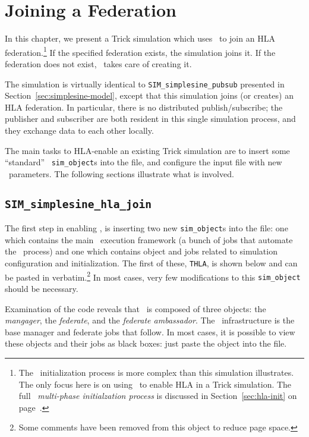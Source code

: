 \chapter{Joining a Federation}
\label{sec:hla-join}

In this chapter, we present a Trick simulation which uses
\TrickHLA\ to join an HLA federation.\footnote{
  The \TrickHLA\ initialization process is more complex than this
  simulation illustrates.
  The only focus here is on using \TrickHLA\ to enable HLA in a Trick
  simulation.
  The full \TrickHLA\ {\em multi-phase initialzation process} is discussed
  in Section~\ref{sec:hla-init} on page~\pageref{sec:hla-init}.
}
If the specified federation exists,
the simulation joins it.
If the federation does not exist, \TrickHLA\ takes care of creating it.

The simulation
is virtually identical to {\tt SIM\_simplesine\_pubsub} presented in
Section~\ref{sec:simplesine-model}, except that this simulation
joins (or creates) an HLA federation.
In particular, there is no distributed publish/subscribe;
the publisher and subscriber are both resident in this single simulation
process, and they exchange data to each other locally.

The main tasks to HLA-enable an existing Trick simulation are to
insert some ``standard'' \TrickHLA\ {\tt sim\_object}s
into the \sdefine file, and
configure the input file with new \TrickHLA\ parameters.
The following sections illustrate what is involved.

\section{\tt SIM\_simplesine\_hla\_join}
\label{sec:SIM-simplesine-hla-join-sdefine}

The first step in enabling \TrickHLA,
is inserting two new {\tt sim\_object}s into the \sdefine file:
one which contains the main \TrickHLA\ execution
framework (a bunch of jobs that automate the \TrickHLA\ process)
and
one which contains object and jobs related to simulation configuration
and initialization.
The first of these, {\tt THLA}, is shown below
and can be pasted in verbatim.\footnote{
  Some comments have been removed from this object to reduce page space.
}
In most cases, very few modifications to this {\tt sim\_object} should
be necessary.

Examination of the code reveals that \TrickHLA\ is composed of three objects:
the {\em mangager}, the {\em federate}, and the {\em federate ambassador}.
The \TrickHLA\ infrastructure is the base manager and federate jobs
that follow.
In most cases, it is possible to view these objects and their
jobs as black boxes: just paste the object into the \sdefine file.

